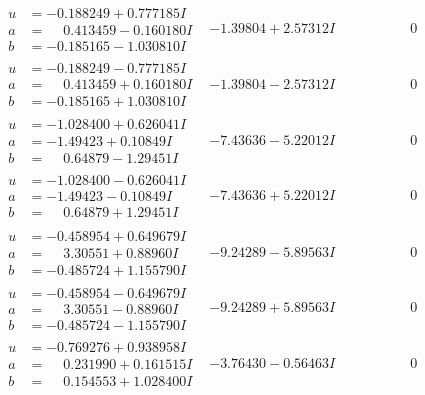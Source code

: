 \documentclass[1p]{elsarticle_modified}
\theoremstyle{definition}
\begin{document}
$$\begin{array}{c|c|c}
\begin{aligned}
u &= -0.188249 + 0.777185 I \\
a &= \phantom{-}0.413459 - 0.160180 I \\
b &= -0.185165 - 1.030810 I\end{aligned}
 & -1.39804 + 2.57312 I & \phantom{-0.000000 } 0 \\ \hline\begin{aligned}
u &= -0.188249 - 0.777185 I \\
a &= \phantom{-}0.413459 + 0.160180 I \\
b &= -0.185165 + 1.030810 I\end{aligned}
 & -1.39804 - 2.57312 I & \phantom{-0.000000 } 0 \\ \hline\begin{aligned}
u &= -1.028400 + 0.626041 I \\
a &= -1.49423 + 0.10849 I \\
b &= \phantom{-}0.64879 - 1.29451 I\end{aligned}
 & -7.43636 - 5.22012 I & \phantom{-0.000000 } 0 \\ \hline\begin{aligned}
u &= -1.028400 - 0.626041 I \\
a &= -1.49423 - 0.10849 I \\
b &= \phantom{-}0.64879 + 1.29451 I\end{aligned}
 & -7.43636 + 5.22012 I & \phantom{-0.000000 } 0 \\ \hline\begin{aligned}
u &= -0.458954 + 0.649679 I \\
a &= \phantom{-}3.30551 + 0.88960 I \\
b &= -0.485724 + 1.155790 I\end{aligned}
 & -9.24289 - 5.89563 I & \phantom{-0.000000 } 0 \\ \hline\begin{aligned}
u &= -0.458954 - 0.649679 I \\
a &= \phantom{-}3.30551 - 0.88960 I \\
b &= -0.485724 - 1.155790 I\end{aligned}
 & -9.24289 + 5.89563 I & \phantom{-0.000000 } 0 \\ \hline\begin{aligned}
u &= -0.769276 + 0.938958 I \\
a &= \phantom{-}0.231990 + 0.161515 I \\
b &= \phantom{-}0.154553 + 1.028400 I\end{aligned}
 & -3.76430 - 0.56463 I & \phantom{-0.000000 } 0 \\ \hline\begin{aligned}

\end{aligned}
\end{array}$$
\end{document}
